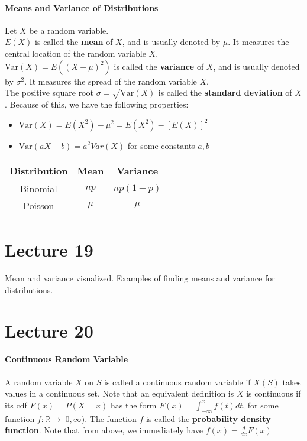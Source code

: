 \documentclass[10pt,letter]{article}
\begin{document}
\paragraph{Means and Variance of Distributions}
Let $X$ be a random variable. \\ 
$E(X)$ is called the \textbf{mean} of $X$, and is usually denoted by $\mu$. It measures the central location of the random variable $X$. \\ 
$\text{Var}(X)=E((X-\mu)^2)$ is called the \textbf{variance} of $X$, and is usually denoted by $\sigma^2$. It measures the spread of the random variable $X$. \\ 
The positive square root $\sigma=\sqrt{\text{Var}(X)}$ is called the \textbf{standard deviation} of $X$. Because of this, we have the following properties: \begin{itemize}
    \item $\text{Var}(X)=E(X^2)-\mu^2=E(X^2)-[E(X)]^2$ 
    \item $\text{Var}(aX+b)=a^2Var(X)$ for some constants $a,b$
\end{itemize}

\begin{tabular}{|c|c|c|}
\hline
Distribution & Mean & Variance \\\hline
Binomial     & $np$   & $np(1-p)$  \\\hline
Poisson      & $\mu$   & $\mu$      \\\hline
\end{tabular}

\section*{Lecture 19}
Mean and variance visualized. Examples of finding means and variance for distributions.

\section*{Lecture 20}
\paragraph{Continuous Random Variable}
A random variable $X$ on $S$ is called a continuous random variable if $X(S)$ takes values in a continuous set. Note that an equivalent definition is $X$ is continuous if its cdf $F(x)=P(X=x)$ has the form $F(x)=\int_{-\infty}^xf(t)dt$, for some function $f:\mathbb{R}\rightarrow [0,\infty)$. The function $f$ is called the \textbf{probability density function}. Note that from above, we immediately have $f(x)=\frac{d}{dx}F(x)$
\end{document}
